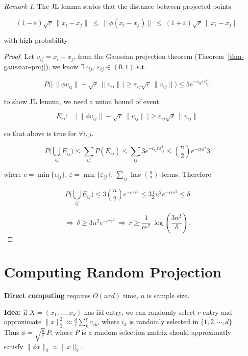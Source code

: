 \documentclass[
  letterpaper,
  DIV=11,
  numbers=noendperiod]{scrreprt}
\theoremstyle{definition}
\theoremstyle{plain}
\theoremstyle{plain}
\theoremstyle{definition}
\theoremstyle{plain}
\theoremstyle{plain}
\theoremstyle{remark}
\newtheorem*{remark}{Remark}
\begin{document}
\begin{remark}
The JL lemma states that the distance between projected points

\[
(1-\varepsilon)\sqrt{r}\,\|x_i - x_j\| \ \le\ \|\phi(x_i - x_j)\| \ \le\ (1+\varepsilon)\sqrt{r}\,\|x_i - x_j\|
\]

with high probability.
\end{remark}

\begin{proof}
Let \(v_{ij} = x_i - x_j\), from the Gaussian projection theorem
(Theorem~\ref{thm-gaussian-proj}), we know
\(\exists\, c_{ij},\ \varepsilon_{ij} \in (0,1)\) s.t.

\[
P\Big(\big|\,\|\phi v_{ij}\| - \sqrt{r}\,\|v_{ij}\|\,\big| \ge \varepsilon_{ij}\sqrt{r}\,\|v_{ij}\| \Big) \le 5 e^{-c_{ij} r \varepsilon_{ij}^2}.
\]

to show JL lemma, we need a union bound of event

\[
E_{ij}:\quad \big|\,\|\phi v_{ij}\| - \sqrt{r}\,\|v_{ij}\|\,\big| \ge \varepsilon_{ij}\sqrt{r}\,\|v_{ij}\|
\]

so that above is true for \(\forall i, j\).

\[
P\Big(\bigcup_{ij} E_{ij}\Big) \le \sum_{ij} P(E_{ij}) \le \sum_{ij} 3 e^{-c_{ij} r \varepsilon_{ij}^2} \le \binom{n}{2} e^{-c r \varepsilon^2} 3
\]

where \(c = \min\{c_{ij}\}\),
\(\varepsilon = \min\{\varepsilon_{ij}\}\), \(\sum_{ij}\) has
\(\binom{n}{2}\) terms. Therefore

\[
P\Big(\bigcup_{ij} E_{ij}\Big) \le 3\binom{n}{2} e^{-c r \varepsilon^2} \le 3\tfrac{1}{2} n^2 e^{-c r \varepsilon^2} \le \delta
\]

\[
\Rightarrow\ \delta \ge 3 n^2 e^{-c r \varepsilon^2}
\ \Rightarrow\ r \ge \frac{1}{c \varepsilon^2}\,\log\!\left(\frac{3n^2}{\delta}\right).
\]
\end{proof}

\section{Computing Random Projection}\label{computing-random-projection}

\textbf{Direct computing} requires \(O(nrd)\) time, \(n\) is sample
size.

\textbf{Idea:} if \(X = (x_1, \dots, x_d)\) has iid entry, we can
randomly select \(r\) entry and approximate
\(\|x\|^2_2 \approx \tfrac{d}{r}\sum_{k}^rv_{ik}\), where \(i_k\) is
randomly selected in \(\{1,2,\cdots,d\}\). Thus
\(\phi = \sqrt{\tfrac{d}{r}}\, P\), where \(P\) is a random selection
matrix should approximatly satisfy \(\|\phi x\|_2 \approx \|x\|_2\).
\end{document}
